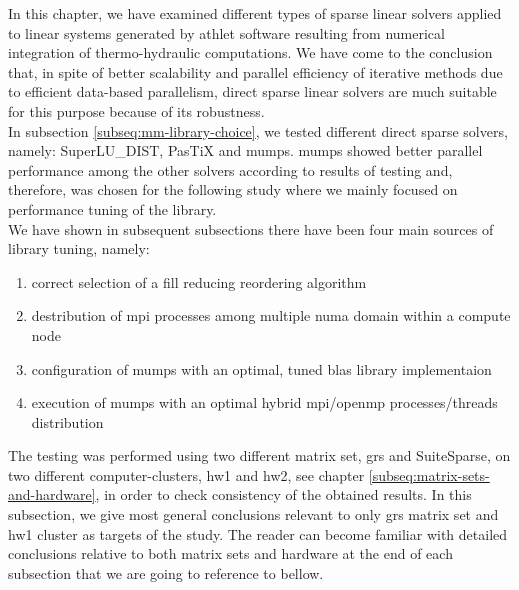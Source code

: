 \label{subseq:mm-conclusion}

In this chapter, we have examined different types of sparse linear solvers applied to linear systems generated by \acrshort{athlet} software resulting from numerical integration of thermo-hydraulic computations. We have come to the conclusion that, in spite of better scalability and parallel efficiency of iterative methods due to efficient data-based parallelism, direct sparse linear solvers are much suitable for this purpose because of its robustness.\\


In subsection \ref{subseq:mm-library-choice}, we tested different direct sparse solvers, namely: SuperLU\_DIST, PasTiX and \acrshort{mumps}. \acrshort{mumps} showed better parallel performance among the other solvers according to results of testing and, therefore, was chosen for the following study where we mainly focused on performance tuning of the library.\\


We have shown in subsequent subsections there have been four main sources of library tuning, namely:

\begin{enumerate}
	\item correct selection of a fill reducing reordering algorithm \label{conclusion:mm-1}
	\item destribution of \acrshort{mpi} processes among multiple \acrshort{numa} domain within a compute node \label{conclusion:mm-2}
	\item configuration of \acrshort{mumps} with an optimal, tuned \acrshort{blas} library implementaion \label{conclusion:mm-3}
	\item execution of \acrshort{mumps} with an optimal hybrid \acrshort{mpi}/\acrshort{openmp} processes/threads distribution \label{conclusion:mm-4}
\end{enumerate}


The testing was performed using two different matrix set, \acrshort{grs} and SuiteSparse, on two different computer-clusters, \gls{hw1} and \gls{hw2}, see chapter \ref{subseq:matrix-sets-and-hardware}, in order to check consistency of the obtained results. In this subsection, we  give most general conclusions relevant to only \acrshort{grs} matrix set and \gls{hw1} cluster as targets of the study. The reader can become familiar with detailed conclusions relative to both matrix sets and hardware at the end of each subsection that we are going to reference to bellow.\\



